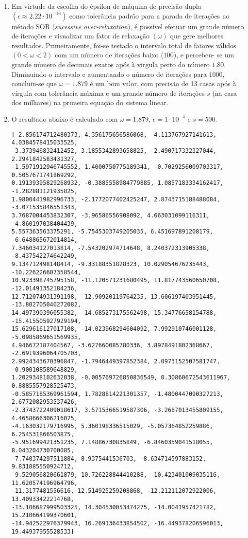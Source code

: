 \documentclass{article}
\newenvironment{arabenum}{
    \begin{enumerate}[label=\textbf{\arabic*})]
}{
    \end{enumerate}
}
\newenvironment{alphenum}{
    \begin{enumerate}[label=(\alph*)]
}{
    \end{enumerate}
}
\begin{document}
\begin{arabenum}
\begin{alphenum}
\item Em virtude da escolha do épsilon de máquina de precisão dupla $(\epsilon
\approx 2.22 \cdot 10^{-16})$ como tolerância padrão para a parada de iterações
no método SOR (\emph{sucessive over-relaxation}), é possível efetuar um grande
número de iterações e visualizar um fator de relaxação $(\omega)$ que gere
melhores resultados. Primeiramente, foi-se testado o intervalo total de fatores
válidos $(0 < \omega < 2)$ com um número de iterações baixo ($100$), e percebeu-
se um grande número de decimais exatos após à virgula perto do número
$\boldsymbol{1.80}$. Diminuindo o intervalo e aumentando o número de iterações
para $1000$, concluiu-se que $\omega = \boldsymbol{1.879}$ é um bom valor, com
precisão de 13 casas após à vírgula com tolerância máxima e um grande número de
iterações $s$ (na casa dos milhares) na primeira equação do sistema linear.

\item O resultado abaixo é calculado com $\omega = 1.879$,
$\epsilon = 1 \cdot 10^{-4}$ e $s = 500$.

\begin{verbatim}
[-2.856174712480373, 4.356175656586068, -4.113767927141613, 4.0384578415033525,
-3.373946832412452, 3.1855342893658825, -2.490717332327044, 2.2941842583431327,
-1.5971912946745552, 1.4000750775189341, -0.7029256009703317, 0.5057671741869292,
0.19139395829268932, -0.3885558984779885, 1.0857183334162417, -1.282881121935825,
1.9800441982996733, -2.1772077402425247, 2.8743715188488084, -3.071535846551343,
3.7687004453832307, -3.96586556908092, 4.663031099116311, -4.860197038404439,
5.557363563375291, -5.7545303749205035, 6.451697891208179, -6.648865672014814,
7.346034127013814, -7.543202974714648, 8.240372313905338, -8.437542274642249,
9.134712498148414, -9.33188351828323, 10.029054676235443, -10.226226607358544,
10.923398745795158, -11.120571231680495, 11.817743560650708, -12.01491352184236,
12.712074931391198, -12.90920119764235, 13.606197403951445, -13.802705040272082,
14.497390396055382, -14.685273175562498, 15.34776658154788, -15.415505927929194,
15.629616127017108, -14.023968294604092, 7.992910746001128, -5.0985869651569935,
4.946672187404567, -3.627660085780336, 3.8978491802368667, -2.6919396064705703,
2.9924343670396847, -1.7946449397852384, 2.0973152507581747, -0.900108589648829,
1.2029348102632038, -0.005769726850836549, 0.30860672543611967, 0.8885557928525473,
-0.5857185369961594, 1.7828814221301357, -1.4800447090327213, 2.6772082953537426,
-2.3743722409018617, 3.5715366519587306, -3.2687013455809155, 4.4658666306216075,
-4.163032179716995, 5.360198336515029, -5.057364852259886, 6.254531866503875,
-5.951699421351235, 7.14886730835849, -6.8460359041518055, 8.043204730700085,
-7.740374297511884, 8.9375441536703, -8.634714597883152, 9.831885550924712,
-9.529056820661879, 10.726228844410288, -10.423401009035116, 11.620574196964796,
-11.3177481556616, 12.514925259208868, -12.212112072922006, 13.40933422214768,
-13.106687999503325, 14.304530053474275, -14.0041957421782, 15.210664199370601,
-14.942522976379943, 16.269136433854502, -16.449378206596013, 19.44937955528533]
\end{verbatim}


\end{alphenum}
\end{arabenum}
\end{document}
